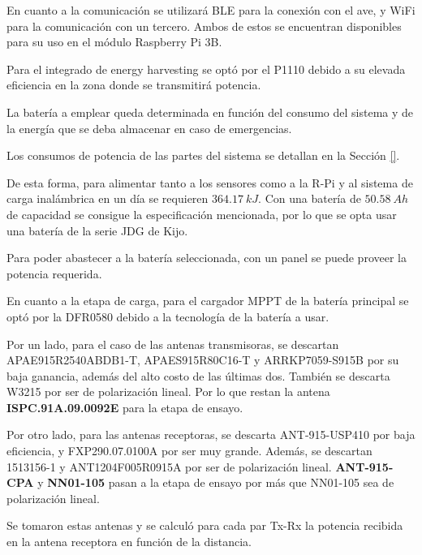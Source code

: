 
En cuanto a la comunicación se utilizará BLE para la conexión con el ave, y WiFi para la comunicación con un tercero.
Ambos de estos se encuentran disponibles para su uso en el módulo Raspberry Pi 3B.


Para el integrado de energy harvesting se optó por el P1110 debido a su elevada eficiencia en la zona donde se transmitirá potencia.


La batería a emplear queda determinada en función del consumo del sistema y de la energía que se deba almacenar en caso de emergencias. 

Los consumos de potencia de las partes del sistema se detallan en la Sección \ref{}.

De esta forma, para alimentar tanto a los sensores como a la R-Pi y al sistema de carga inalámbrica en un día se requieren $364.17 \ kJ$. Con una batería de $50.58 \ Ah$ de capacidad se consigue la especificación mencionada, por lo que se opta usar una batería de la serie JDG de Kijo.


Para poder abastecer a la batería seleccionada, con un panel \TBD se puede proveer la potencia requerida.

En cuanto a la etapa de carga, para el cargador MPPT de la batería principal se optó por la DFR0580  debido a la tecnología de la batería a usar.

Por un lado, para el caso de las antenas transmisoras, se descartan APAE915R2540ABDB1-T, APAES915R80C16-T y ARRKP7059-S915B por su baja ganancia, además del alto costo de las últimas dos. También se descarta W3215 por ser de polarización lineal. Por lo que restan la antena \textbf{ISPC.91A.09.0092E} para la etapa de ensayo.

Por otro lado, para las antenas receptoras, se descarta ANT-915-USP410 por baja eficiencia, y FXP290.07.0100A por ser muy grande. Además, se descartan 1513156-1 y ANT1204F005R0915A por ser de polarización lineal. \textbf{ANT-915-CPA} y \textbf{NN01-105} pasan a la etapa de ensayo por más que NN01-105 sea de polarización lineal.

Se tomaron estas antenas y se calculó para cada par Tx-Rx la potencia recibida en la antena receptora en función de la distancia.

